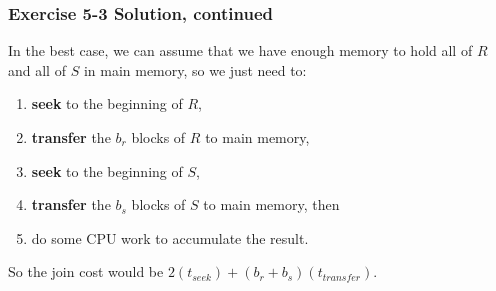 \begin{frame}
\frametitle{Exercise 5-3 Solution, continued}

In the best case, we can assume that we have enough memory to hold all of $R$ and all of $S$ in main memory, so we just need to:

\begin{enumerate}
  \item \textbf{seek} to the beginning of $R$,
  \item \textbf{transfer} the $b_r$ blocks of $R$ to main memory,
  \item \textbf{seek} to the beginning of $S$,
  \item \textbf{transfer} the $b_s$ blocks of $S$ to main memory, then
  \item do some CPU work to accumulate the result.
\end{enumerate}

So the join cost would be $2(t_{seek}) + (b_r + b_s)(t_{transfer})$.

\end{frame}

